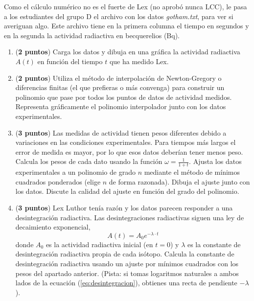 Como el cálculo numérico no es el fuerte de Lex (no aprobó nunca LCC), le pasa a los estudiantes del grupo D el archivo con los datos \textit{gotham.txt}, para ver si averiguan algo. Este archivo tiene en la primera columna el tiempo en segundos y en la segunda la actividad radiactiva en becquerelios (Bq).

\begin{enumerate}
	\item (\textbf{2 puntos}) Carga los datos y dibuja en una gráfica la actividad radiactiva $A(t)$ en función del tiempo $t$ que ha medido Lex.
	\item (\textbf{2 puntos}) Utiliza el método de interpolación de Newton-Gregory o diferencias finitas (el que prefieras o más convenga) para construir un polinomio que pase por todos los puntos de datos de actividad medidos. Representa gráficamente el polinomio interpolador junto con los datos experimentales.
	\item (\textbf{3 puntos}) Las medidas de actividad tienen pesos diferentes debido a variaciones en las condiciones experimentales. Para tiempos más largos el error de medida es mayor, por lo que esos datos deberían tener menos peso. Calcula los pesos de cada dato usando la función $\omega=\frac{1}{1+t}$. Ajusta los datos experimentales a un polinomio de grado $n$ mediante el método de mínimos cuadrados ponderados (elige $n$ de forma razonada). Dibuja el ajuste junto con los datos. Discute la calidad del ajuste en función del grado del polinomio.
	\item (\textbf{3 puntos}) Lex Luthor tenía razón y los datos parecen responder a una desintegración radiactiva. Las desintegraciones radiactivas siguen una ley de decaimiento exponencial,
	\begin{equation}\label{eq:desintegracion}
		A(t)=A_0 e^{-\lambda\cdot t}
	\end{equation}
	donde $A_0$ es la actividad radiactiva inicial (en $t=0$) y $\lambda$ es la constante de desintegración radiactiva propia de cada isótopo. Calcula la constante de desintegración radiactiva usando un ajuste por mínimos cuadrados con los pesos del apartado anterior.
	(Pista: si tomas logaritmos naturales a ambos lados de la ecuación (\ref{eq:desintegracion}), obtienes una recta de pendiente $-\lambda$).
\end{enumerate}

\fussy
